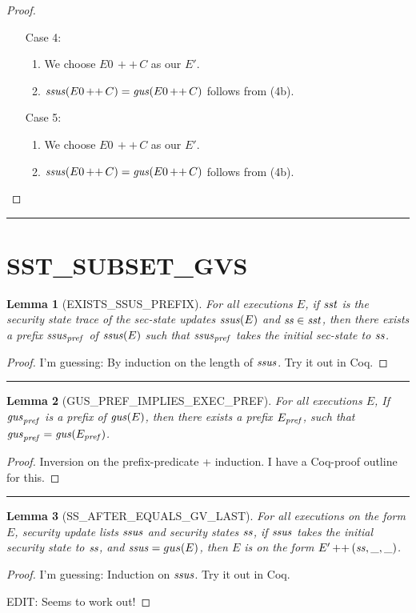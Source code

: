\documentclass[a4paper,11pt]{article}
\newtheorem{lemma}{Lemma}
\newcommand{\app}{\mathit{\,++\,}}
\newcommand{\sep}{\hspace{-1.5707965cm}\rule{\paperwidth}{1pt}}
\begin{document}
\begin{proof}
\begin{enumerate}
\begin{enumerate}
    \item[Case 4:]
      \begin{enumerate}
      \item We choose $E0 \app C$ as our $E'$.
      \item $\ssus(E0 \app C) = \gus(E0 \app C)$ follows from (4b).
      \end{enumerate}
    \item[Case 5:]
      \begin{enumerate}
      \item We choose $E0 \app C$ as our $E'$.
      \item $\ssus(E0 \app C) = \gus(E0 \app C)$ follows from (4b).
      \end{enumerate}
    \end{enumerate}
  \end{enumerate}
\end{proof}

\sep



\newpage
\section{SST\_SUBSET\_GVS}

\begin{lemma}[EXISTS\_SSUS\_PREFIX]\label{lem:exists_ssus_prefix}
For all executions $E$, if $\sst$ is the security state trace of the sec-state updates $\ssus(E)$ and $\ss \in \sst$, then there exists a prefix $\ssus_\pref$ of $\ssus(E)$ such that $\ssus_\pref$ takes the initial sec-state to $\ss$.
\end{lemma}
\begin{proof}
I'm guessing: By induction on the length of $\ssus$. Try it out in Coq.
\end{proof}

\sep

\begin{lemma}[GUS\_PREF\_IMPLIES\_EXEC\_PREF]\label{lem:gus_pref_implies_exec_pref}
For all executions $E$, If $\gus_\pref$ is a prefix of $\gus(E)$, then there exists a prefix $E_\pref$, such that $\gus_\pref = \gus(E_\pref)$.
\end{lemma}
\begin{proof}
Inversion on the prefix-predicate + induction. I have a Coq-proof outline for this.
\end{proof}

\sep

\begin{lemma}[SS\_AFTER\_EQUALS\_GV\_LAST]\label{lem:ss_after_equals_gv_last}
For all executions on the form $E$, security update lists $\ssus$ %
and security states $\ss$, if $\ssus$ takes the initial security state to $\ss$, and $\ssus = gus(E)$, then $E$ is on the form $E' \app (\ss, \_, \_)$.
\end{lemma}
\begin{proof}
I'm guessing: Induction on $\ssus$. Try it out in Coq.

EDIT: Seems to work out!
\end{proof}
\end{document}
